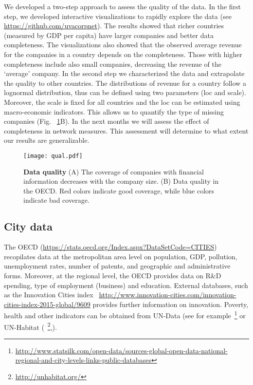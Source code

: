 We developed a two-step approach to assess the quality of the data. In the first step, we developed interactive visualizations to rapidly explore the data (see \url{https://github.com/uvacorpnet}). The results showed that richer countries (measured by GDP per capita) have larger companies and better data completeness. 
The visualizations also showed that the observed average revenue for the companies in a country depends on the completeness. 
Those with higher completeness include also small companies, 
decreasing the revenue of the `average' company. 
In the second step we characterized the data and extrapolate the quality to other countries. 
The distributions of revenue for a country follow a lognormal distribution, 
thus can be defined using two parameters (loc and scale). 
Moreover, the scale is fixed for all countries and the loc can be estimated using macro-economic indicators. 
This allows us to quantify the type of missing companies (Fig. ~\ref{fig:qual}B). 
In the next months we will assess the effect of completeness in network measures. 
This assessment will determine to what extent our results are generalizable. 

\begin{figure}
\begin{center}
\texttt{[image: qual.pdf]}
\caption{\textbf{Data quality} (A) The coverage of companies with financial information decreases with the company size. (B) Data quality in the OECD. Red colors indicate good coverage, while blue colors indicate bad coverage.}
\label{fig:qual}
\end{center}
\end{figure}



\subsection{City data}
The OECD (\url{https://stats.oecd.org/Index.aspx?DataSetCode=CITIES}) recopilates data at the metropolitan area level on population, GDP, pollution, unemployment rates, number of patents, and geographic and administrative forms.
Moreover, at the regional level, 
the OECD provides data on R\&D spending, type of employment (business) and education.
External databases, such as the Innovation Cities index ~\url{http://www.innovation-cities.com/innovation-cities-index-2015-global/9609} provides further information on innovation.
Poverty, health and other indicators can be obtained from UN-Data (see for example~\footnote{\url{http://www.statsilk.com/open-data/sources-global-open-data-national-regional-and-city-levels-links-public-databases}} or UN-Habitat (~\footnote{\url{http://unhabitat.org/}},\cite{leautier2006cities}).

